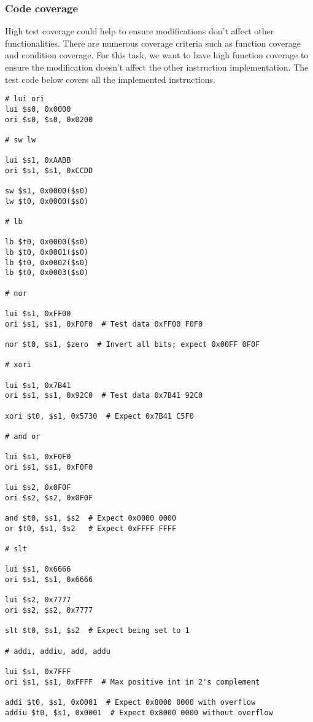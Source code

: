 \newpage
\subsubsection{Code coverage}

High test coverage could help to ensure modifications don't affect other functionalities. There are numerous coverage criteria such as function coverage and condition coverage. For this task, we want to have high function coverage to ensure the modification doesn't affect the other instruction implementation. The test code below covers all the implemented instructions.

\begin{verbatim}
# lui ori
lui $s0, 0x0000
ori $s0, $s0, 0x0200

# sw lw

lui $s1, 0xAABB
ori $s1, $s1, 0xCCDD

sw $s1, 0x0000($s0)
lw $t0, 0x0000($s0)

# lb

lb $t0, 0x0000($s0)
lb $t0, 0x0001($s0)
lb $t0, 0x0002($s0)
lb $t0, 0x0003($s0)

# nor

lui $s1, 0xFF00
ori $s1, $s1, 0xF0F0  # Test data 0xFF00 F0F0

nor $t0, $s1, $zero  # Invert all bits; expect 0x00FF 0F0F

# xori

lui $s1, 0x7B41
ori $s1, $s1, 0x92C0  # Test data 0x7B41 92C0

xori $t0, $s1, 0x5730  # Expect 0x7B41 C5F0

# and or

lui $s1, 0xF0F0
ori $s1, $s1, 0xF0F0

lui $s2, 0x0F0F
ori $s2, $s2, 0x0F0F

and $t0, $s1, $s2  # Expect 0x0000 0000
or $t0, $s1, $s2   # Expect 0xFFFF FFFF

# slt

lui $s1, 0x6666
ori $s1, $s1, 0x6666

lui $s2, 0x7777
ori $s2, $s2, 0x7777

slt $t0, $s1, $s2  # Expect being set to 1

# addi, addiu, add, addu

lui $s1, 0x7FFF
ori $s1, $s1, 0xFFFF  # Max positive int in 2's complement

addi $t0, $s1, 0x0001  # Expect 0x8000 0000 with overflow
addiu $t0, $s1, 0x0001  # Expect 0x8000 0000 without overflow


\end{verbatim}

